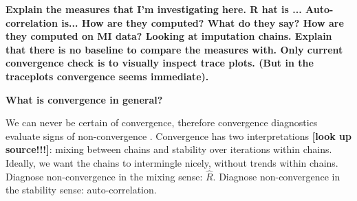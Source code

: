\documentclass[article]{jss}
\begin{document}
\textbf{Explain the measures that I'm investigating here. R hat is ... Auto-correlation is... How are they computed? What do they say? How are they computed on MI data? Looking at imputation chains. 
Explain that there is no baseline to compare the measures with. Only current convergence check is to visually inspect trace plots. (But in the traceplots convergence seems immediate).}



\textbf{What is convergence in general?}

We can never be certain of convergence, therefore convergence diagnostics evaluate signs of non-convergence \citep{hoff09}. %
Convergence has two interpretations \textbf{[look up source!!!]}: mixing between chains and stability over iterations within chains. Ideally, we want the chains to intermingle nicely, without trends within chains.  Diagnose non-convergence in the mixing sense: $\widehat{R}$. Diagnose non-convergence in the stability sense: auto-correlation. 
\end{document}
